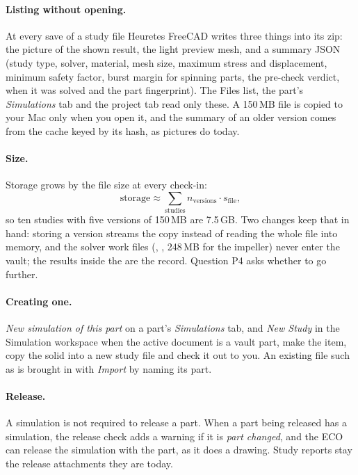 \paragraph{Listing without opening.} At every save of a study file Heuretes FreeCAD writes three things into its zip: the
picture of the shown result, the light preview mesh, and a summary JSON (study type, solver, material, mesh size,
maximum stress and displacement, minimum safety factor, burst margin for spinning parts, the pre-check verdict, when it
was solved and the part fingerprint). The Files list, the part's \emph{Simulations} tab and the project tab read only
these. A 150\,MB file is copied to your Mac only when you open it, and the summary of an older version comes from the
cache keyed by its hash, as pictures do today.

\paragraph{Size.} Storage grows by the file size at every check-in:
\[
  \text{storage}\approx\sum_\text{studies} n_\text{versions}\cdot s_\text{file},
\]
so ten studies with five versions of 150\,MB are 7.5\,GB. Two changes keep that in hand: storing a version streams the
copy instead of reading the whole file into memory, and the solver work files (, , 248\,MB for
the impeller) never enter the vault; the results inside the  are the record. Question P4 asks whether to
go further.

\paragraph{Creating one.} \emph{New simulation of this part} on a part's \emph{Simulations} tab, and \emph{New Study}
in the Simulation workspace when the active document is a vault part, make the item, copy the solid into a new study
file and check it out to you. An existing file such as  is brought in with \emph{Import} by
naming its part.

\paragraph{Release.} A simulation is not required to release a part. When a part being released has a simulation,
the release check adds a warning if it is \emph{part changed}, and the ECO can release the simulation with the part,
as it does a drawing. Study reports stay the release attachments they are today.

